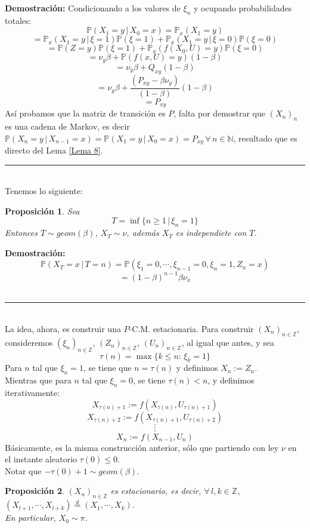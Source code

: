 \documentclass[a4paper]{article}
\newcommand{\prob}{\mathbb{P}}
\newtheorem{prop}{Proposici\'on}
\numberwithin{equation}{subsection}
\numberwithin{definicion}{subsection}
\def\N{\mathbb N}
\def\Z{\mathbb Z}
\begin{document}
\textbf{Demostración: }Condicionando a los valores de $\xi_n$ y ocupando probabilidades totales:
\[\prob(X_1 = y\,|\,X_0=x) = \prob_x(X_1=y)\]
\[= \prob_x(X_1=y\,|\,\xi = 1)\prob(\xi =1) + \prob_x(X_1=y\,|\,\xi=0)\prob(\xi=0)\]
\[ = \prob(Z = y)\prob(\xi = 1) + \prob_x(f(X_0,U)=y)\prob(\xi=0)\]
\[ = \nu_y\beta + \prob(f(x,U)=y)(1-\beta)\]
\[ = \nu_y \beta + Q_{xy}(1-\beta)\]
\[=\nu_y\beta + \frac{(P_{xy}-\beta \nu_y)}{(1-\beta)}(1-\beta)\]
\[= P_{xy}\]
Así probamos que la matriz de transición es $P$, falta por demostrar que $(X_n)_n$ es una cadena de Markov, es decir $\prob(X_n=y\,|\,X_{n-1}=x)=\prob(X_1=y\,|\,X_0=x)=P_{xy}\,\forall\,n\in\N$, resultado que es directo del Lema \ref{Lema 8}.\\
\rule{0.7em}{0.7em}\\ \newline
Tenemos lo siguiente:
\begin{prop}
Sea
\[T = \inf\{n\geq 1\,|\,\xi_n=1\}\]
Entonces $T\sim geom(\beta)$, $X_T \sim \nu$, además $X_T$ es independiete con $T$.
\end{prop}

\textbf{Demostración: }
\[\prob(X_T = x\,|\,T=n) = \prob(\xi_1 = 0,\cdots,\xi_{n-1}=0,\xi_n=1,Z_n=x)\]
\[ = (1-\beta)^{n-1}\beta \nu_x\]\\
\rule{0.7em}{0.7em}\\ \newline
La idea, ahora, es construir una $P$-C.M. estacionaria. Para construir $(X_n)_{n\in \Z}$, consideremos $(\xi_n)_{n\in \Z}$, $(Z_n)_{n\in \Z}$, $(U_n)_{n\in \Z}$, al igual que antes, y sea
\[\tau(n) = \max\{k\leq n:\,\xi_k=1\}\]
Para $n$ tal que  $\xi_n = 1$, se tiene que  $n=\tau(n)$ y definimos $X_n:=Z_n$.\\ Mientras que para $n$ tal que $\xi_n =0$, se tiene $\tau(n)<n$, y definimos iterativamente:
\[X_{\tau(n)+1}:= f(X_{\tau(n)},U_{\tau(n)+1})\]
\[X_{\tau(n)+2}:= f(X_{\tau(n)+1},U_{\tau(n)+2})\]
\[\cdot\]
\[\cdot\]
\[\cdot\]
\[X_n:= f(X_{n-1},U_n)\]
Básicamente, es la misma construcción  anterior, sólo que partiendo  con ley $\nu$ en el instante aleatorio $\tau(0)\leq 0$.\\ \newline
Notar que $-\tau(0)+1 \sim geom(\beta)$.
\begin{prop}
$(X_n)_{n\in \Z}$ es estacionario, es decir, $\forall\, l,k\in \Z$, $(X_{l+1},\cdots,X_{l+k}) \overset{\,d\,}{=}(X_1,\cdots,X_k)$.\\ En particular, $X_0\sim \pi$.
\end{prop}
\end{document}
